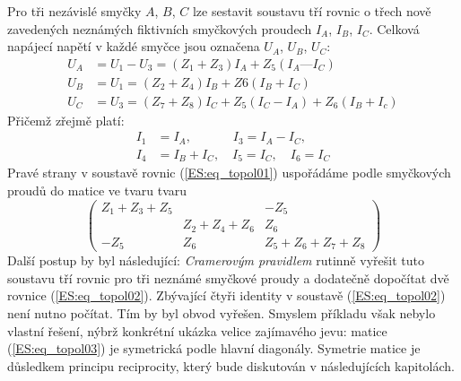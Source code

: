 \begin{example}
  Pro tři nezávislé smyčky \(A\), \(B\), \(C\) lze sestavit soustavu tří rovnic o třech nově 
  zavedených neznámých fiktivních smyčkových proudech \(I_A\), \(I_B\), \(I_C\). Celková napájecí 
  napětí v každé smyčce jsou označena \(U_A\), \(U_B\), \(U_C\):
  \begin{align}\label{ES:eq_topol01}
    U_A &= U_1-U_3 = (Z_1 + Z_3)I_A +Z_5(I_A — I_C)           \nonumber\\
    U_B &= U_1     = (Z_2 + Z_4)I_B+Z6(I_B + I_C)             \nonumber\\
    U_C &= U_3     = (Z_7 + Z_8)I_C+Z_5(I_C - I_A)+Z_6(I_B+I_c)  
  \end{align}
  Přičemž zřejmě platí:
  \begin{subequations}
    \begin{align}\label{ES:eq_topol02}
     I_1 &= I_A,       \qquad\quad\; I_3 = I_A - I_C,                   \\
     I_4 &= I_B + I_C, \quad I_5 = I_C, \quad I_6 = I_C
    \end{align}
    \end{subequations}
  Pravé strany v soustavě rovnic (\ref{ES:eq_topol01}) uspořádáme podle smyčkových proudů do   
  matice ve tvaru tvaru
  \begin{equation}\label{ES:eq_topol03}
   \left(
     \begin{array}{cccc}
       Z_1+Z_3+Z_5  &              &-Z_5  \\
                    & Z_2+Z_4+Z_6  & Z_6  \\
               -Z_5 & Z_6          & Z_5+Z_6+Z_7+Z_8 
     \end{array}
   \right) 
  \end{equation}
  Další postup by byl následující: \emph{Cramerovým pravidlem} rutinně vyřešit tuto soustavu tří 
  rovnic pro tři neznámé smyčkové proudy a dodatečně dopočítat dvě rovnice (\ref{ES:eq_topol02}). 
  Zbývající čtyři identity v soustavě (\ref{ES:eq_topol02}) není nutno počítat. Tím by byl obvod 
  vyřešen. Smyslem příkladu však nebylo vlastní řešení, nýbrž konkrétní ukázka velice zajímavého 
  jevu: matice (\ref{ES:eq_topol03}) je symetrická podle hlavní diagonály. Symetrie matice je 
  důsledkem principu reciprocity, který bude diskutován v následujících kapitolách.
\end{example}